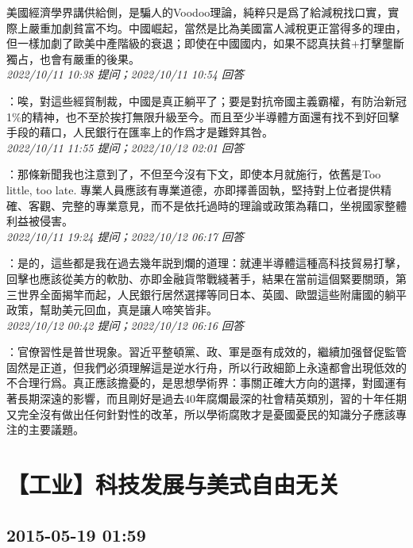 \documentclass[twocolumn]{ctexart}
\begin{document}
美國經濟學界講供給側，是騙人的Voodoo理論，純粹只是爲了給減稅找口實，實際上嚴重加劇貧富不均。中國崛起，當然是比為美國富人減稅更正當得多的理由，但一樣加劇了歐美中產階級的衰退；即使在中國國内，如果不認真扶貧+打擊壟斷獨占，也會有嚴重的後果。
\\

\textit{\hfill\noindent\small 2022/10/11 10:38 提问；2022/10/11 10:54 回答}

：唉，對這些經貿制裁，中國是真正躺平了；要是對抗帝國主義霸權，有防治新冠1\%的精神，也不至於挨打無限升級至今。而且至少半導體方面還有找不到好回擊手段的藉口，人民銀行在匯率上的作爲才是難辤其咎。
\\

\textit{\hfill\noindent\small 2022/10/11 11:55 提问；2022/10/12 02:01 回答}

：那條新聞我也注意到了，不但至今沒有下文，即使本月就施行，依舊是Too little, too late. 專業人員應該有專業道德，亦即擇善固執，堅持對上位者提供精確、客觀、完整的專業意見，而不是依托過時的理論或政策為藉口，坐視國家整體利益被侵害。
\\

\textit{\hfill\noindent\small 2022/10/11 19:24 提问；2022/10/12 06:17 回答}

：是的，這些都是我在過去幾年説到爛的道理：就連半導體這種高科技貿易打擊，回擊也應該從美方的軟肋、亦即金融貨幣戰綫著手，結果在當前這個緊要關頭，第三世界全面揭竿而起，人民銀行居然選擇等同日本、英國、歐盟這些附庸國的躺平政策，幫助美元回血，真是讓人啼笑皆非。
\\

\textit{\hfill\noindent\small 2022/10/12 00:42 提问；2022/10/12 06:16 回答}

：官僚習性是普世現象。習近平整頓黨、政、軍是亟有成效的，繼續加强督促監管固然是正道，但我們必須理解這是逆水行舟，所以行政細節上永遠都會出現低效的不合理行爲。真正應該擔憂的，是思想學術界：事關正確大方向的選擇，對國運有著長期深遠的影響，而且剛好是過去40年腐爛最深的社會精英類別，習的十年任期又完全沒有做出任何針對性的改革，所以學術腐敗才是憂國憂民的知識分子應該專注的主要議題。
\\


\section{【工业】科技发展与美式自由无关 }
\subsection{2015-05-19 01:59}
\end{document}
